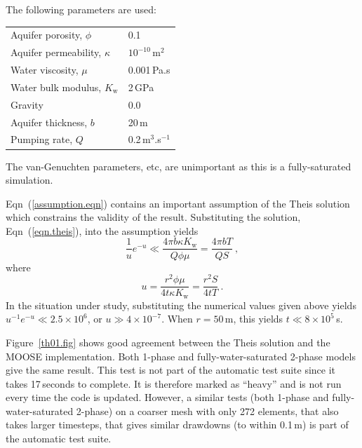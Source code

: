 \documentclass[]{scrreprt}
\begin{document}
The following parameters are used:
\begin{center}
\begin{tabular}{|ll|}
\hline
Aquifer porosity, $\phi$ & 0.1 \\
Aquifer permeability, $\kappa$ & $10^{-10}$\,m$^{2}$ \\
\hline
Water viscosity, $\mu$ & 0.001\,Pa.s \\
Water bulk modulus, $K_{\mathrm{w}}$ & 2\,GPa \\
\hline
Gravity & 0.0 \\
Aquifer thickness, $b$ & 20\,m  \\
Pumping rate, $Q$ & 0.2\,m$^{3}$.s$^{-1}$ \\
\hline
\end{tabular}
\end{center}
The van-Genuchten parameters, etc, are unimportant as this is a
fully-saturated simulation.

Eqn~(\ref{assumption.eqn}) contains an important assumption of the
Theis solution which constrains the validity of the result.
Substituting the solution, Eqn~(\ref{eqn.theis}), into the assumption
yields
\begin{equation} 
\frac{1}{u} e^{-u} \ll \frac{4 \pi b \kappa K_{\mathrm{w}}}{Q\phi\mu}
= \frac{4\pi b T}{QS} \ ,
\end{equation}
where
\begin{equation}
u = \frac{r^{2}\phi\mu}{4t\kappa K_{\mathrm{w}}} = \frac{r^{2}S}{4tT}
\ .
\end{equation}
In the situation under study, substituting the numerical values given
above yields $u^{-1}e^{-u} \ll 2.5\times 10^{6}$, or $u\gg 4\times
10^{-7}$.  When $r=50$\,m, this yields $t\ll 8\times 10^{5}$\,s.

Figure~\ref{th01.fig} shows good agreement between the Theis solution
and the MOOSE implementation.  Both 1-phase and fully-water-saturated
2-phase models give the same result.  This test is not part of the
automatic test suite since it takes 17\,seconds to complete.  It is
therefore marked as ``heavy'' and is not run every time the code is
updated.  However, a similar tests (both 1-phase and
fully-water-saturated 2-phase) on a coarser mesh with only 272
elements, that also takes larger timesteps, that gives similar
drawdowns (to within 0.1\,m) is part of the automatic test suite.
\end{document}

